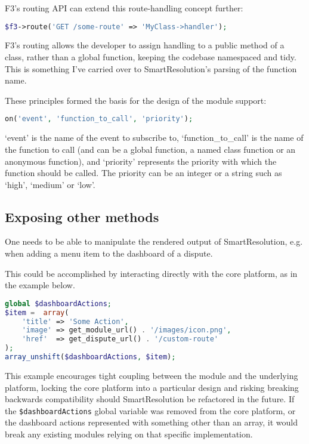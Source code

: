 F3's routing API can extend this route-handling concept further:

\begin{lstlisting}[language=php]
$f3->route('GET /some-route' => 'MyClass->handler');
\end{lstlisting}

F3's routing allows the developer to assign handling to a public method of a class, rather than a global function, keeping the codebase namespaced and tidy. This is something I've carried over to SmartResolution's parsing of the function name.

These principles formed the basis for the design of the module support:

\begin{lstlisting}[language=php]
on('event', 'function_to_call', 'priority');
\end{lstlisting}

`event' is the name of the event to subscribe to, `function\_to\_call' is the name of the function to call (and can be a global function, a named class function or an anonymous function), and `priority' represents the priority with which the function should be called. The priority can be an integer or a string such as `high', `medium' or `low'.

\subsection{Exposing other methods}

One needs to be able to manipulate the rendered output of SmartResolution, e.g. when adding a menu item to the dashboard of a dispute.

This could be accomplished by interacting directly with the core platform, as in the example below.

\begin{lstlisting}[language=php]
global $dashboardActions;
$item =  array(
    'title' => 'Some Action',
    'image' => get_module_url() . '/images/icon.png',
    'href'  => get_dispute_url() . '/custom-route'
);
array_unshift($dashboardActions, $item);
\end{lstlisting}

This example encourages tight coupling between the module and the underlying platform, locking the core platform into a particular design and risking breaking backwards compatibility should SmartResolution be refactored in the future. If the \lstinline{$dashboardActions} global variable was removed from the core platform, or the dashboard actions represented with something other than an array, it would break any existing modules relying on that specific implementation.

